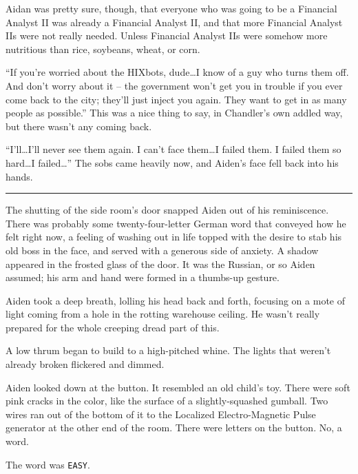 \documentclass[11pt]{book}
\begin{document}
	Aidan was pretty sure, though, that everyone who was going to be a Financial Analyst II was already a Financial Analyst II, and that more Financial Analyst IIs were not really needed. Unless Financial Analyst IIs were somehow more nutritious than rice, soybeans, wheat, or corn.
		
	``If you're worried about the HIXbots, dude\dots I know of a guy who turns them off. And don't worry about it -- the government won't get you in trouble if you ever come back to the city; they'll just inject you again. They want to get in as many people as possible.'' This was a nice thing to say, in Chandler's own addled way, but there wasn't any coming back.
	
	``I'll\dots I'll never see them again. I can't face them\dots I failed them. I failed them so hard\dots I failed\dots'' The sobs came heavily now, and Aiden's face fell back into his hands.
	
	\vspace{0.5cm}
	\hrule
	\vspace{0.5cm}

	The shutting of the side room's door snapped Aiden out of his reminiscence. There was probably some twenty-four-letter German word that conveyed how he felt right now, a feeling of washing out in life topped with the desire to stab his old boss in the face, and served with a generous side of anxiety. A shadow appeared in the frosted glass of the door. It was the Russian, or so Aiden assumed; his arm and hand were formed in a thumbs-up gesture.
	
	Aiden took a deep breath, lolling his head back and forth, focusing on a mote of light coming from a hole in the rotting warehouse ceiling. He wasn't really prepared for the whole creeping dread part of this.
	
	A low thrum began to build to a high-pitched whine. The lights that weren't already broken flickered and dimmed. 
	
	Aiden looked down at the button. It resembled an old child's toy. There were soft pink cracks in the color, like the surface of a slightly-squashed gumball. Two wires ran out of the bottom of it to the Localized Electro-Magnetic Pulse generator at the other end of the room. There were letters on the button. No, a word.
	
	The word was \texttt{EASY}.
	
\end{document}
